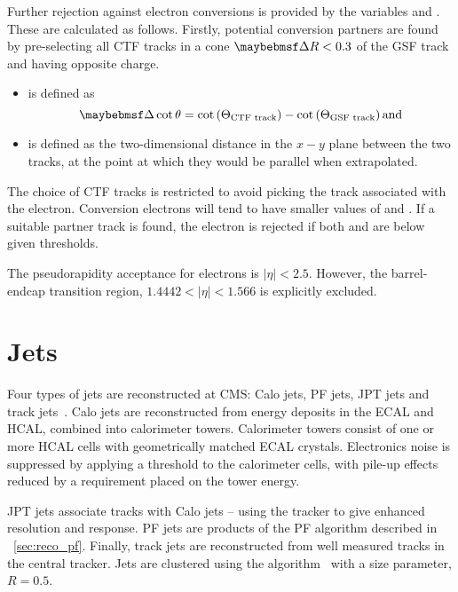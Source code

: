 Further rejection against electron conversions is provided by the variables
\Distnm and \DeltaCotThetanm. These are calculated as follows. Firstly,
potential conversion partners are found by pre-selecting all \ac{CTF} tracks in
a cone $\DeltaR < 0.3$ of the \ac{GSF} track and having opposite charge.
\begin{itemize}
\item \DeltaCotThetanm is defined as
\begin{equation*}
  \DeltaCotThetanm = \cot\left(\Theta_{\textrm{CTF track}}\right) - \cot\left(\Theta_{\textrm{GSF track}}\right) \textrm{and}
\end{equation*}
\item \Distnm is defined as the two-dimensional distance in the $x-y$ plane
  between the two tracks, at the point at which they would be parallel when
  extrapolated.
\end{itemize}
The choice of \ac{CTF} tracks is restricted to avoid picking the track
associated with the electron. Conversion electrons will tend to have smaller
values of \DeltaCotTheta and \Dist. If a suitable partner track is found, the
electron is rejected if both \Dist and \DeltaCotTheta are below given
thresholds.

The pseudorapidity acceptance for electrons is $|\eta| < 2.5$. However, the
barrel-endcap transition region, $1.4442 < |\eta| < 1.566$ is explicitly excluded.



\section{Jets}
\label{sec:reco_jets}
Four types of jets are reconstructed at \ac{CMS}: \acf{Calo} jets, \ac{PF} jets,
\ac{JPT} jets and track jets~\cite{jet_perf_pas}. \ac{Calo} jets are
reconstructed from energy deposits in the \ac{ECAL} and \ac{HCAL}, combined into
calorimeter towers. Calorimeter towers consist of one or more \ac{HCAL} cells
with geometrically matched \ac{ECAL} crystals. Electronics noise is suppressed
by applying a threshold to the calorimeter cells, with pile-up effects reduced
by a requirement placed on the tower energy.

\ac{JPT} jets associate tracks with \ac{Calo} jets -- using the tracker to give
enhanced \Pt resolution and response. \ac{PF} jets are products of the \acl{PF}
algorithm described in \sec~\ref{sec:reco_pf}. Finally, track jets are
reconstructed from well measured tracks in the central tracker. Jets are
clustered using the \antiKT algorithm~\cite{antiKT} with a size parameter,
$R=0.5$.

